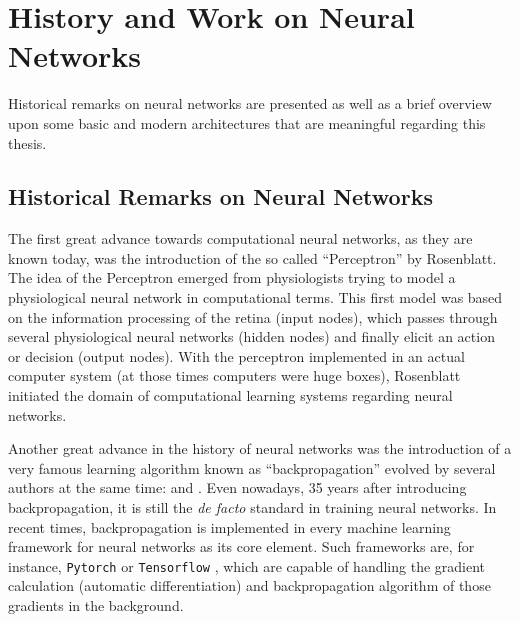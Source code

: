 
\section{History and Work on Neural Networks}\label{sec:prev_nn}
Historical remarks on neural networks are presented as well as a brief overview upon some basic and modern architectures that are meaningful regarding this thesis.



\subsection{Historical Remarks on Neural Networks}\label{sec:prev_nn_history}
The first great advance towards computational neural networks, as they are known today, was the introduction of the so called \enquote{Perceptron} \cite{Rosenblatt1958} by Rosenblatt. 
The idea of the Perceptron emerged from physiologists trying to model a physiological neural network in computational terms. 
This first model was based on the information processing of the retina (input nodes), which passes through several physiological neural networks (hidden nodes) and finally elicit an action or decision (output nodes).
With the perceptron implemented in an actual computer system (at those times computers were huge boxes), Rosenblatt initiated the domain of computational learning systems regarding neural networks.

Another great advance in the history of neural networks was the introduction of a very famous learning algorithm known as \enquote{backpropagation} evolved by several authors at the same time: \cite{LeCun1986} and \cite{Rumelhart1986}. 
Even nowadays, 35 years after introducing backpropagation, it is still the \emph{de facto} standard in training neural networks.
In recent times, backpropagation is implemented in every machine learning framework for neural networks as its core element.
Such frameworks are, for instance, \texttt{Pytorch} \cite{Pytorch} or \texttt{Tensorflow} \cite{Tensorflow}, which are capable of handling the gradient calculation (automatic differentiation) and backpropagation algorithm of those gradients in the background.

